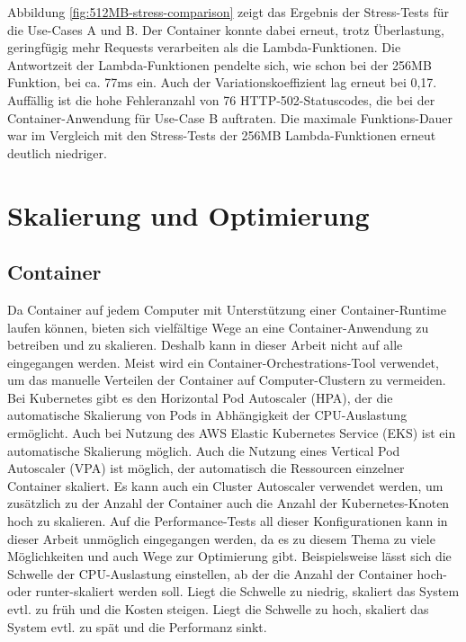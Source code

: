 Abbildung \ref{fig:512MB-stress-comparison} zeigt das Ergebnis der Stress-Tests für die Use-Cases A und B. Der Container konnte dabei erneut, trotz Überlastung, geringfügig mehr Requests verarbeiten als die Lambda-Funktionen. Die Antwortzeit der Lambda-Funktionen pendelte sich, wie schon bei der 256MB Funktion, bei ca. 77ms ein. Auch der Variationskoeffizient lag erneut bei 0,17. Auffällig ist die hohe Fehleranzahl von 76 HTTP-502-Statuscodes, die bei der Container-Anwendung für Use-Case B auftraten. Die maximale Funktions-Dauer war im Vergleich mit den Stress-Tests der 256MB Lambda-Funktionen erneut deutlich niedriger.


\section{Skalierung und Optimierung}
\subsection{Container}
Da Container auf jedem Computer mit Unterstützung einer Container-Runtime laufen können, bieten sich vielfältige Wege an eine Container-Anwendung zu betreiben und zu skalieren. Deshalb kann in dieser Arbeit nicht auf alle eingegangen werden. Meist wird ein Container-Orchestrations-Tool verwendet, um das manuelle Verteilen der Container auf Computer-Clustern zu vermeiden. Bei Kubernetes gibt es den Horizontal Pod Autoscaler (HPA), der die automatische Skalierung von Pods in Abhängigkeit der CPU-Auslastung ermöglicht\cite{noauthor_horizontal_nodate-1}. Auch bei Nutzung des AWS Elastic Kubernetes Service (EKS) ist ein automatische Skalierung möglich\cite{noauthor_horizontal_nodate}. Auch die Nutzung eines Vertical Pod Autoscaler (VPA) ist möglich, der automatisch die Ressourcen einzelner Container skaliert\cite{noauthor_vertical_nodate}. Es kann auch ein Cluster Autoscaler verwendet werden, um zusätzlich zu der Anzahl der Container auch die Anzahl der Kubernetes-Knoten hoch zu skalieren\cite{noauthor_cluster_nodate}.
Auf die Performance-Tests all dieser Konfigurationen kann in dieser Arbeit unmöglich eingegangen werden, da es zu diesem Thema zu viele Möglichkeiten und auch Wege zur Optimierung gibt. Beispielsweise lässt sich die Schwelle der CPU-Auslastung einstellen, ab der die Anzahl der Container hoch- oder runter-skaliert werden soll. Liegt die Schwelle zu niedrig, skaliert das System evtl. zu früh und die Kosten steigen. Liegt die Schwelle zu hoch, skaliert das System evtl. zu spät und die Performanz sinkt.

